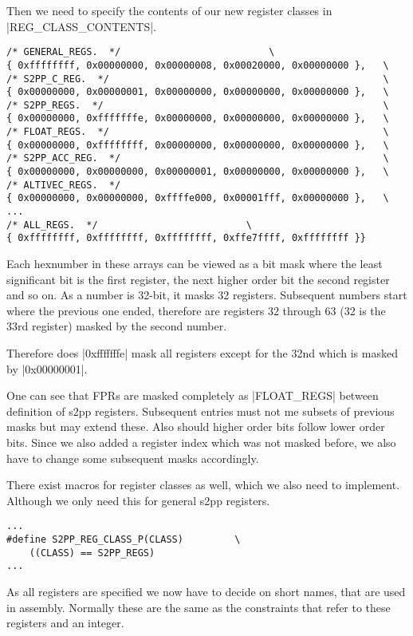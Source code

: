 Then we need to specify the contents of our new register classes in |REG_CLASS_CONTENTS|.
\begin{lstlisting}
/* GENERAL_REGS.  */                          \
{ 0xffffffff, 0x00000000, 0x00000008, 0x00020000, 0x00000000 },   \
/* S2PP_C_REG.  */                                                \
{ 0x00000000, 0x00000001, 0x00000000, 0x00000000, 0x00000000 },   \
/* S2PP_REGS.  */                                                 \
{ 0x00000000, 0xfffffffe, 0x00000000, 0x00000000, 0x00000000 },   \
/* FLOAT_REGS.  */                                                \
{ 0x00000000, 0xffffffff, 0x00000000, 0x00000000, 0x00000000 },   \
/* S2PP_ACC_REG.  */                                              \
{ 0x00000000, 0x00000000, 0x00000001, 0x00000000, 0x00000000 },   \
/* ALTIVEC_REGS.  */
{ 0x00000000, 0x00000000, 0xffffe000, 0x00001fff, 0x00000000 },   \
...
/* ALL_REGS.  */                          \
{ 0xffffffff, 0xffffffff, 0xffffffff, 0xffe7ffff, 0xffffffff }}
\end{lstlisting}

Each hexnumber in these arrays can be viewed as a bit mask where the least significant bit is the first register, the next higher order bit the second register and so on.
As a number is 32-bit, it masks 32 registers.
Subsequent numbers start where the previous one ended, therefore are registers 32 through 63 (32 is the 33rd register) masked by the second number.

Therefore does |0xfffffffe| mask all registers except for the 32nd which is masked by |0x00000001|.

One can see that FPRs are masked completely as |FLOAT_REGS| between definition of s2pp registers.
Subsequent entries must not me subsets of previous masks but may extend these.
Also should higher order bits follow lower order bits.
Since we also added a register index which was not masked before, we also have to change some subsequent masks accordingly.

There exist macros for register classes as well, which we also need to implement.
Although we only need this for general s2pp registers.
\begin{lstlisting}
...
#define S2PP_REG_CLASS_P(CLASS)         \
    ((CLASS) == S2PP_REGS)
...
\end{lstlisting}

As all registers are specified we now have to decide on short names, that are used in assembly.
Normally these are the same as the constraints that refer to these registers and an integer.

